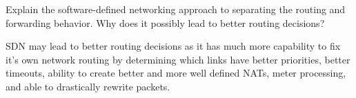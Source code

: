 \documentclass[12pt,addpoints,answers]{exam}
\begin{document}
\begin{questions}


\question[8] Explain the software-defined networking approach to separating the routing and forwarding behavior. Why does it possibly lead to better routing decisions?
\begin{solution}
	SDN may lead to better routing decisions as it has much more capability to fix it's own network routing by determining which links have better priorities, better timeouts, ability to create better and more well defined NATs, meter processing, and able to drastically rewrite packets.
\end{solution}


\end{questions}
\end{document}
